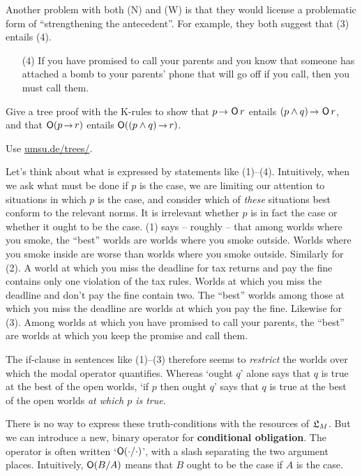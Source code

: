 Another problem with both (N) and (W) is that they would license a problematic
form of ``strengthening the antecedent''. For example, they both suggest that
(3)  entails (4).
\begin{itemize}[leftmargin=10mm]
\itemsep-1mm
\item[(4)] If you have promised to call your parents and you know that someone
  has attached a bomb to your parents' phone that will go off if you call, then
  you must call them.
\end{itemize}

\begin{exercise}
  Give a tree proof with the K-rules to show that $p \to \Ob r$ entails
  $(p \land q) \to \Ob r$, and that $\Ob (p \to r)$ entails
  $\Ob((p \land q) \to r)$.
\end{exercise}
\begin{solution}
  Use \href{https://www.umsu.de/trees/}{umsu.de/trees/}.
\end{solution}

Let's think about what is expressed by statements like (1)--(4). Intuitively,
when we ask what must be done if $p$ is the case, we are limiting our attention
to situations in which $p$ is the case, and consider which of \emph{these}
situations best conform to the relevant norms. It is irrelevant whether $p$ is
in fact the case or whether it ought to be the case. (1) says -- roughly -- that
among worlds where you smoke, the ``best'' worlds are worlds where you smoke
outside. Worlds where you smoke inside are worse than worlds where you smoke
outside. Similarly for (2). A world at which you miss the deadline for tax
returns and pay the fine contains only one violation of the tax rules. Worlds at
which you miss the deadline and don't pay the fine contain two. The ``best''
worlds among those at which you miss the deadline are worlds at which you pay
the fine. Likewise for (3). Among worlds at which you have promised to call your
parents, the ``best'' are worlds at which you keep the promise and call them.

The if-clause in sentences like (1)--(3) therefore seems to \emph{restrict} the
worlds over which the modal operator quantifies. Whereas `ought $q$' alone says
that $q$ is true at the best of the open worlds, `if $p$ then ought $q$' says
that $q$ is true at the best of the open worlds \emph{at which $p$ is true}.

There is no way to express these truth-conditions with the resources of $\mathfrak{L}_M$.
But we can introduce a new, binary operator for \textbf{conditional obligation}.
The operator is often written `$\operatorname{\mathsf{O}}(\cdot/\cdot)$', with a slash separating the
two argument places. Intuitively, $\operatorname{\mathsf{O}}(B/A)$ means that $B$ ought to be the
case if $A$ is the case.

